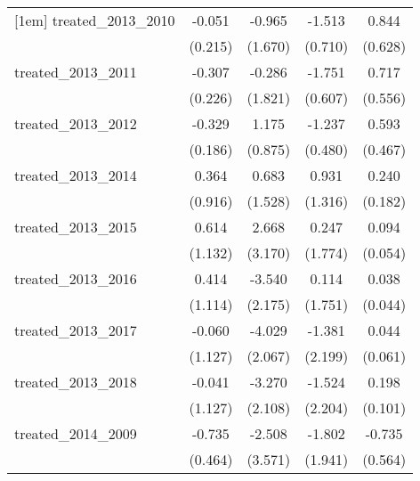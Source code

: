 {\begin{tabular}{l*{4}{c}}
[1em]
treated\_2013\_2010&      -0.051         &      -0.965         &      -1.513\sym{*}  &       0.844         \\
            &     (0.215)         &     (1.670)         &     (0.710)         &     (0.628)         \\
[1em]
treated\_2013\_2011&      -0.307         &      -0.286         &      -1.751\sym{**} &       0.717         \\
            &     (0.226)         &     (1.821)         &     (0.607)         &     (0.556)         \\
[1em]
treated\_2013\_2012&      -0.329         &       1.175         &      -1.237\sym{**} &       0.593         \\
            &     (0.186)         &     (0.875)         &     (0.480)         &     (0.467)         \\
[1em]
treated\_2013\_2014&       0.364         &       0.683         &       0.931         &       0.240         \\
            &     (0.916)         &     (1.528)         &     (1.316)         &     (0.182)         \\
[1em]
treated\_2013\_2015&       0.614         &       2.668         &       0.247         &       0.094         \\
            &     (1.132)         &     (3.170)         &     (1.774)         &     (0.054)         \\
[1em]
treated\_2013\_2016&       0.414         &      -3.540         &       0.114         &       0.038         \\
            &     (1.114)         &     (2.175)         &     (1.751)         &     (0.044)         \\
[1em]
treated\_2013\_2017&      -0.060         &      -4.029         &      -1.381         &       0.044         \\
            &     (1.127)         &     (2.067)         &     (2.199)         &     (0.061)         \\
[1em]
treated\_2013\_2018&      -0.041         &      -3.270         &      -1.524         &       0.198\sym{*}  \\
            &     (1.127)         &     (2.108)         &     (2.204)         &     (0.101)         \\
[1em]
treated\_2014\_2009&      -0.735         &      -2.508         &      -1.802         &      -0.735         \\
            &     (0.464)         &     (3.571)         &     (1.941)         &     (0.564)         \\

\end{tabular}}
